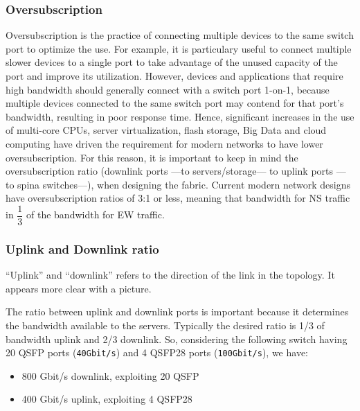\subsubsection{Oversubscription}
Oversubscription is the practice of connecting multiple devices to the same
switch port to optimize the use. For example, it is particulary useful to connect multiple slower devices to a single port to take advantage of the unused
capacity of the port and improve its utilization. However, devices and applications that require high bandwidth should generally connect with a switch
port 1-on-1, because multiple devices connected to the same switch port may
contend for that port’s bandwidth, resulting in poor response time. Hence,
significant increases in the use of multi-core CPUs, server virtualization, flash
storage, Big Data and cloud computing have driven the requirement for modern networks to have lower oversubscription. For this reason, it is important
to keep in mind the oversubscription ratio (downlink ports ---to servers/storage--- to uplink ports ---to spina switches---), when designing the fabric.
Current modern network designs have oversubscription ratios of 3:1 or less, meaning that bandwidth for NS traffic in $\dfrac{1}{3}$ of the bandwidth for EW traffic.

\newpage
\subsubsection{Uplink and Downlink ratio}
``Uplink'' and ``downlink'' refers to the direction of the link in the topology. It appears more clear with a picture.

The ratio between uplink and downlink ports is important because it determines the bandwidth available to the servers. Typically the desired ratio is 1/3 of bandwidth uplink and 2/3 downlink.
So, considering the following switch having 20 QSFP ports (\texttt{40Gbit/s}) and 4 QSFP28 ports (\texttt{100Gbit/s}), we have:
\begin{itemize}
   \item 800 Gbit/s downlink, exploiting 20 QSFP
   \item 400 Gbit/s uplink, exploiting 4 QSFP28
\end{itemize}

